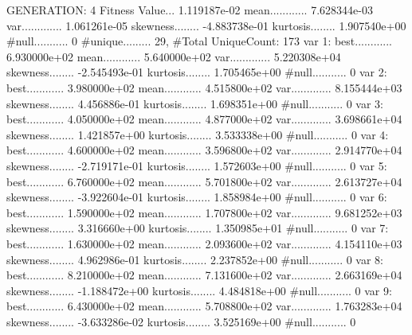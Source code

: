 \documentclass[oneside,letterpaper,titlepage]{article}
\begin{document}
\begin{Schunk}
\begin{Soutput}
GENERATION: 4
Fitness Value... 1.119187e-02
mean............ 7.628344e-03
var............. 1.061261e-05
skewness........ -4.883738e-01
kurtosis........ 1.907540e+00
#null........... 0
#unique......... 29, #Total UniqueCount: 173
var 1:
best............ 6.930000e+02
mean............ 5.640000e+02
var............. 5.220308e+04
skewness........ -2.545493e-01
kurtosis........ 1.705465e+00
#null........... 0
var 2:
best............ 3.980000e+02
mean............ 4.515800e+02
var............. 8.155444e+03
skewness........ 4.456886e-01
kurtosis........ 1.698351e+00
#null........... 0
var 3:
best............ 4.050000e+02
mean............ 4.877000e+02
var............. 3.698661e+04
skewness........ 1.421857e+00
kurtosis........ 3.533338e+00
#null........... 0
var 4:
best............ 4.600000e+02
mean............ 3.596800e+02
var............. 2.914770e+04
skewness........ -2.719171e-01
kurtosis........ 1.572603e+00
#null........... 0
var 5:
best............ 6.760000e+02
mean............ 5.701800e+02
var............. 2.613727e+04
skewness........ -3.922604e-01
kurtosis........ 1.858984e+00
#null........... 0
var 6:
best............ 1.590000e+02
mean............ 1.707800e+02
var............. 9.681252e+03
skewness........ 3.316660e+00
kurtosis........ 1.350985e+01
#null........... 0
var 7:
best............ 1.630000e+02
mean............ 2.093600e+02
var............. 4.154110e+03
skewness........ 4.962986e-01
kurtosis........ 2.237852e+00
#null........... 0
var 8:
best............ 8.210000e+02
mean............ 7.131600e+02
var............. 2.663169e+04
skewness........ -1.188472e+00
kurtosis........ 4.484818e+00
#null........... 0
var 9:
best............ 6.430000e+02
mean............ 5.708800e+02
var............. 1.763283e+04
skewness........ -3.633286e-02
kurtosis........ 3.525169e+00
#null........... 0


\end{Soutput}
\end{Schunk}
\end{document}
